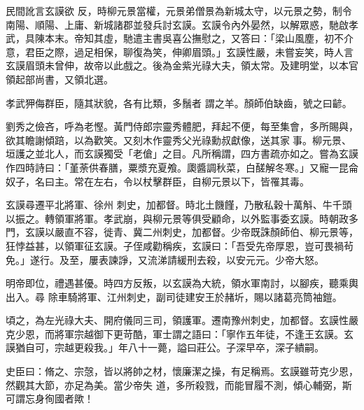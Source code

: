 \begin{pinyinscope}
 民間訛言玄謨欲
 反，時柳元景當權，元景弟僧景為新城太守，以元景之勢，制令南陽、順陽、上庸、新城諸郡並發兵討玄謨。玄謨令內外晏然，以解眾惑，馳啟孝武，具陳本末。帝知其虛，馳遣主書吳喜公撫慰之，又答曰：「梁山風塵，初不介意，君臣之際，過足相保，聊復為笑，伸卿眉頭。」玄謨性嚴，未嘗妄笑，時人言玄謨眉頭未曾伸，故帝以此戲之。後為金紫光祿大夫，領太常。及建明堂，以本官領起部尚書，又領北選。



 孝武狎侮群臣，隨其狀貌，各有比類，多鬚者
 謂之羊。顏師伯缺齒，號之曰齴。



 劉秀之儉吝，呼為老慳。黃門侍郎宗靈秀體肥，拜起不便，每至集會，多所賜與，欲其瞻謝傾踣，以為歡笑。又刻木作靈秀父光祿勳叔獻像，送其家事。柳元景、垣護之並北人，而玄謨獨受「老傖」之目。凡所稱謂，四方書疏亦如之。嘗為玄謨作四時詩曰：「堇荼供春膳，粟漿充夏飧。瓟醬調秋菜，白醝解冬寒。」又寵一昆侖奴子，名曰主。常在左右，令以杖擊群臣，自柳元景以下，皆罹其毒。



 玄謨尋遷平北將軍、徐州
 刺史，加都督。時北土饑饉，乃散私穀十萬斛、牛千頭以振之。轉領軍將軍。孝武崩，與柳元景等俱受顧命，以外監事委玄謨。時朝政多門，玄謨以嚴直不容，徙青、冀二州刺史，加都督。少帝既誅顏師伯、柳元景等，狂悖益甚，以領軍征玄謨。子侄咸勸稱疾，玄謨曰：「吾受先帝厚恩，豈可畏禍茍免。」遂行。及至，屢表諫諍，又流涕請緩刑去殺，以安元元。少帝大怒。



 明帝即位，禮遇甚優。時四方反叛，以玄謨為大統，領水軍南討，以腳疾，聽乘輿出入。尋
 除車騎將軍、江州刺史，副司徒建安王於赭圻，賜以諸葛亮筒袖鎧。



 頃之，為左光祿大夫、開府儀同三司，領護軍。遷南豫州刺史，加都督。玄謨性嚴克少恩，而將軍宗越御下更苛酷，軍士謂之語曰：「寧作五年徒，不逢王玄謨。玄謨猶自可，宗越更殺我。」年八十一薨，謚曰莊公。子深早卒，深子繢嗣。



 史臣曰：脩之、宗愨，皆以將帥之材，懷廉潔之操，有足稱焉。玄謨雖苛克少恩，然觀其大節，亦足為美。當少帝失
 道，多所殺戮，而能冒履不測，傾心輔弼，斯可謂忘身徇國者歟！



\end{pinyinscope}